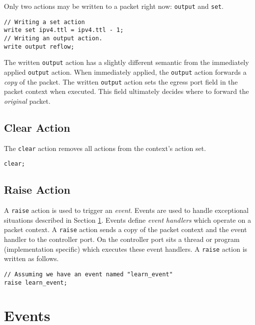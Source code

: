 Only two actions may be written to a packet right now: \texttt{output} and \texttt{set}.

\begin{lstlisting}
// Writing a set action
write set ipv4.ttl = ipv4.ttl - 1;
// Writing an output action.
write output reflow;
\end{lstlisting}

The written \texttt{output} action has a slightly different semantic from the immediately
applied \texttt{output} action. When immediately applied, the \texttt{output} action forwards a
\textit{copy} of the packet. The written \texttt{output} action sets the egress port field
in the packet context when executed. This field ultimately decides where to forward the
\textit{original} packet.

\subsection{Clear Action} \label{tut:clear_action}

The \texttt{clear} action removes all actions from the context's action set.

\begin{lstlisting}
clear;
\end{lstlisting}

\subsection{Raise Action} \label{tut:raise_action}

A \texttt{raise} action is used to trigger an \textit{event}. Events are used to
handle exceptional situations described in Section \ref{tut:event}. Events
define \textit{event handlers} which operate on a packet context. A \texttt{raise} action
sends a copy of the packet context and the event handler to the controller port.
On the controller port sits a thread or program (implementation specific) which
executes these event handlers. A \texttt{raise} action is written as follows.

\begin{lstlisting}
// Assuming we have an event named "learn_event"
raise learn_event;
\end{lstlisting}

\section{Events} \label{tut:event}

